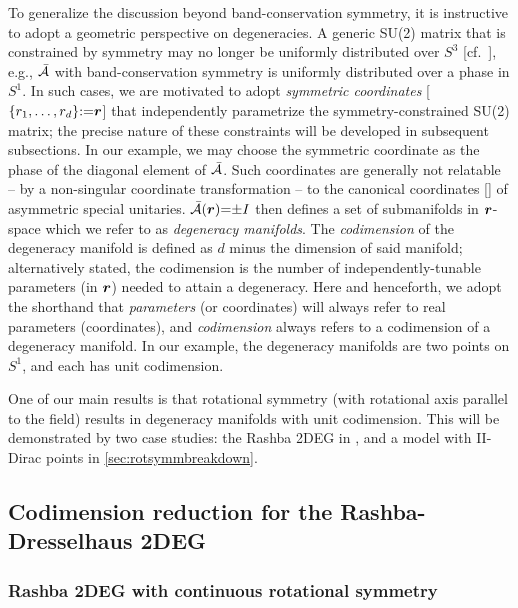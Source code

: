 \documentclass[aps, showpacs, twocolumn, notitlepage, superscriptaddress]{revtex4-1}
\begin{document}
To generalize the discussion beyond band-conservation symmetry, it is instructive to adopt a geometric perspective on degeneracies. A generic SU(2) matrix that is constrained by symmetry may no longer be uniformly distributed over $S^3$ [cf.\ ], e.g., ${\cal \bar{A}}$ with band-conservation symmetry is uniformly distributed over a phase in $S^1$. In such cases, we are  motivated to adopt \textit{symmetric coordinates} [$\{r_1,\ldots,r_{d}\}{:}{=}\boldsymbol{r}$] that independently parametrize the symmetry-constrained SU(2) matrix; the precise nature of these constraints will be developed in subsequent subsections.
In our example, we may choose the symmetric coordinate as the phase of the diagonal element of ${\cal \bar{A}}$. Such coordinates are generally not relatable -- by a non-singular coordinate transformation -- to the canonical coordinates [] of asymmetric special unitaries. ${\cal \bar{A}}(\boldsymbol{r}){=}{\pm}I$ then defines a set of submanifolds in $\boldsymbol{r}$-space which we refer to as \textit{degeneracy manifolds}. The \textit{codimension} of the degeneracy manifold  is defined as $d$ minus the dimension of said manifold; alternatively stated, the codimension is the number of independently-tunable parameters (in $\boldsymbol{r}$) needed to attain a degeneracy. Here and henceforth, we adopt the shorthand that  \textit{parameters} (or coordinates) will always refer to real parameters (coordinates), and \textit{codimension} always refers to a codimension of a degeneracy manifold. In our example, the degeneracy manifolds  are two points on $S^1$, and each has unit codimension. 
 
One of our main results is that  rotational symmetry (with rotational axis parallel to the field) results in degeneracy manifolds with unit codimension. This will be demonstrated by two  case studies: the Rashba 2DEG in , and a model with II-Dirac points in \ref{sec:rotsymmbreakdown}. 

\subsection{Codimension reduction for the Rashba-Dresselhaus 2DEG}\label{sec:singleparameterrashba}

\subsubsection{Rashba 2DEG with continuous rotational symmetry}\label{sec:ctsrot}
\end{document}
